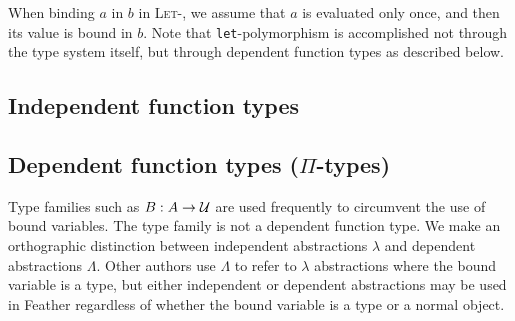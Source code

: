 \documentclass[11pt]{book}
\begin{document}
When binding \( a \) in \( b \) in \textsc{Let-\rcomp}, we assume that \( a \) is evaluated only once, and then its value is bound in \( b \).
Note that \lstinline{let}-polymorphism is accomplished not through the type system itself, but through dependent function types as described below.

\subsection{Independent function types}

\subsection{Dependent function types (\texorpdfstring{$\Pi$}{Π}-types)}

Type families such as \( B:A \to \mathcal{U} \) are used frequently to circumvent the use of bound variables.
The type family is not a dependent function type.
We make an orthographic distinction between independent abstractions \( \lambda \) and dependent abstractions \( \Lambda \).
Other authors use \( \Lambda \) to refer to \( \lambda \) abstractions where the bound variable is a type, but either independent or dependent abstractions may be used in Feather regardless of whether the bound variable is a type or a normal object.
\end{document}

